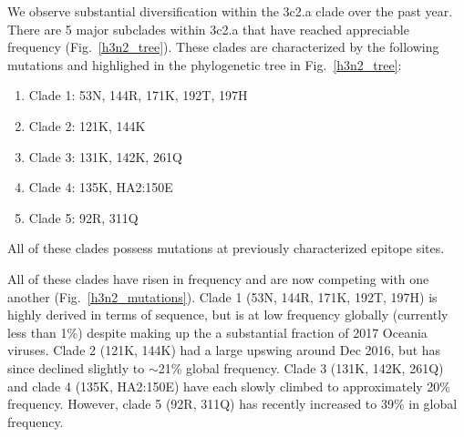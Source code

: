 \documentclass[11pt,oneside,letterpaper]{article}
\newcommand{\FIG}[1]{Fig.~\ref{#1}}
\begin{document}
We observe substantial diversification within the 3c2.a clade over the
past year. There are 5 major subclades within 3c2.a that have reached
appreciable frequency (\FIG{h3n2_tree}). These clades are characterized by the following
mutations and highlighed in the phylogenetic tree in \FIG{h3n2_tree}:

\begin{enumerate}
\item  Clade 1: 53N, 144R, 171K, 192T, 197H
\item  Clade 2: 121K, 144K
\item  Clade 3: 131K, 142K, 261Q
\item  Clade 4: 135K, HA2:150E
\item  Clade 5: 92R, 311Q
\end{enumerate}

All of these clades possess mutations at previously characterized
epitope sites.

All of these clades have risen in frequency and are now competing with
one another (\FIG{h3n2_mutations}). Clade 1 (53N, 144R, 171K, 192T, 197H) is highly derived in
terms of sequence, but is at low frequency globally (currently less than
1\%) despite making up the a substantial fraction of 2017 Oceania
viruses. Clade 2 (121K, 144K) had a large upswing around Dec 2016, but has since declined slightly to $\sim$21\% global frequency. Clade 3 (131K, 142K,
261Q) and clade 4 (135K, HA2:150E) have each slowly climbed to
approximately 20\% frequency. However, clade 5 (92R, 311Q) has recently
increased to 39\% in global frequency.
\end{document}
